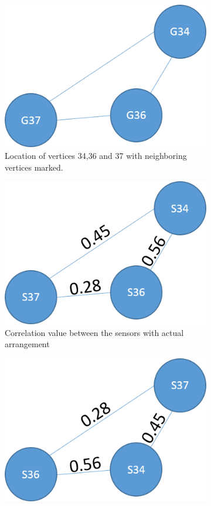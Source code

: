 \begin{figure}[!ht]
\centering
\begin{subfigure}[b]{0.4\textwidth}
\centering
\includegraphics[scale=0.5]{./pics/grid_arr.png}
\caption{Location of vertices 34,36 and 37 with neighboring vertices marked.}
\label{fig:true_arr}
\qquad
\end{subfigure}
\begin{subfigure}[b]{0.4\textwidth}
\centering
\includegraphics[scale=0.5]{./pics/true_arr.png}
\caption{Correlation value between the sensors with actual arrangement}
\label{fig:true_arr}
\qquad
\end{subfigure}
\begin{subfigure}[b]{0.4\textwidth}
\centering
\includegraphics[scale=0.5]{./pics/computer_arr.png}

\end{subfigure}
\end{figure}
